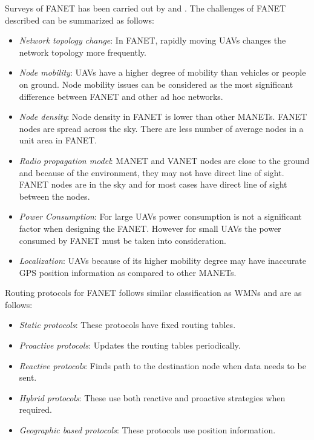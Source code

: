 Surveys of FANET has been carried out by  and . The challenges of FANET described can be summarized as follows:

\begin{itemize}
	\item \textit{Network topology change}: In FANET, rapidly moving UAVs changes the network topology more frequently.
	\item \textit{Node mobility}: UAVs have a higher degree of mobility than vehicles or people on ground. Node mobility issues can be considered as the most significant difference between FANET and other ad hoc networks.
	\item \textit{Node density}: Node density in FANET is lower than other MANETs. FANET nodes are spread across the sky. There are less number of average nodes in a unit area in FANET. 
	\item \textit{Radio propagation model}: MANET and VANET nodes are close to the ground and because of the environment, they may not have direct line of sight. FANET nodes are in the sky and for most cases have direct line of sight between the nodes.
	\item \textit{Power Consumption}: For large UAVs power consumption is not a significant factor when designing the FANET. However for small UAVs the power consumed by FANET must be taken into consideration.  
	\item \textit{Localization}: UAVs because of its higher mobility degree may have inaccurate GPS position information as compared to other MANETs.	
\end{itemize}

Routing protocols for FANET follows similar classification as WMNs and are as follows:

\begin{itemize} 
	\item \textit{Static protocols}: These protocols have fixed routing tables.
	\item \textit{Proactive protocols}: Updates the routing tables periodically.
	\item \textit{Reactive protocols}: Finds path to the destination node when data needs to be sent.
	\item \textit{Hybrid protocols}: These use both reactive and proactive strategies when required. 
	\item \textit{Geographic based protocols}: These protocols use position information.
\end{itemize}

